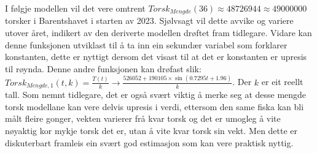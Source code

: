 \documentclass{report}
\begin{document}
I følgje modellen vil det vere omtrent $Torsk_{Mengde}(36)\approx 48726944 \approx 49000000$ torsker i Barentshavet i starten av 2023. Sjølvsagt vil dette avvike og variere utover året, indikert av den deriverte modellen drøftet fram tidlegare.
Vidare kan denne funksjonen utviklast til å ta inn ein sekundær variabel som forklarer konstanten, dette er nyttigt dersom det visast til at det er konstanten er upresis til røynda.
Denne andre funksjonen kan drøfast slik: $Torsk_{Mengde,1}(t,k)=\frac{T(t)}{k}\rightarrow \frac{526052+190105\times \sin(0.7295t+1.96)}{k}$. Der $k$ er eit reellt tall. 
Som nemnt tidlegare, det er også svært viktig å merke seg at desse mengde torsk modellane kan vere delvis upresis i verdi, ettersom den same fiska kan bli målt fleire gonger, vekten varierer frå kvar torsk og det er umogleg å vite nøyaktig kor mykje torsk det er, utan å vite kvar torsk sin vekt.
Men dette er diskuterbart framleis ein svært god estimasjon som kan vere praktisk nyttig.
\end{document}
